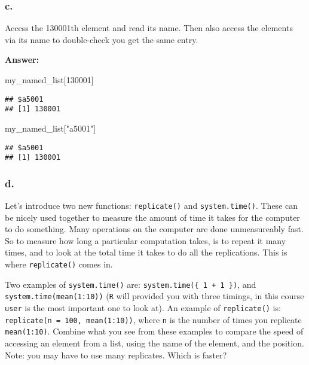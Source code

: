 \documentclass[]{article}
\newenvironment{Shaded}{\begin{snugshade}}{\end{snugshade}}
\newcommand{\DecValTok}[1]{\textcolor[rgb]{0.00,0.00,0.81}{#1}}
\newcommand{\NormalTok}[1]{#1}
\newcommand{\StringTok}[1]{\textcolor[rgb]{0.31,0.60,0.02}{#1}}
\begin{document}
\hypertarget{c.-2}{%
\subsubsection{c.}\label{c.-2}}

Access the 130001th element and read its name. Then also access the
elements via its name to double-check you get the same entry.

\textbf{Answer:}

\begin{Shaded}
\begin{Highlighting}[]
\NormalTok{my_named_list[}\DecValTok{130001}\NormalTok{]}
\end{Highlighting}
\end{Shaded}

\begin{verbatim}
## $a5001
## [1] 130001
\end{verbatim}

\begin{Shaded}
\begin{Highlighting}[]
\NormalTok{my_named_list[}\StringTok{"a5001"}\NormalTok{]}
\end{Highlighting}
\end{Shaded}

\begin{verbatim}
## $a5001
## [1] 130001
\end{verbatim}

\hypertarget{d.-2}{%
\subsubsection{d.}\label{d.-2}}

Let's introduce two new functions: \texttt{replicate()} and
\texttt{system.time()}. These can be nicely used together to measure the
amount of time it takes for the computer to do something. Many
operations on the computer are done unmeasureably fast. So to measure
how long a particular computation takes, is to repeat it many times, and
to look at the total time it takes to do all the replications. This is
where \texttt{replicate()} comes in.

Two examples of \texttt{system.time()} are:
\texttt{system.time(\{\ 1\ +\ 1\ \})}, and
\texttt{system.time(mean(1:10))} (\texttt{R} will provided you with
three timings, in this course \texttt{user} is the most important one to
look at). An example of \texttt{replicate()} is:
\texttt{replicate(n\ =\ 100,\ mean(1:10))}, where \texttt{n} is the
number of times you replicate \texttt{mean(1:10)}. Combine what you see
from these examples to compare the speed of accessing an element from a
list, using the name of the element, and the position. Note: you may
have to use many replicates. Which is faster?
\end{document}
